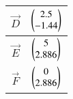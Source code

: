 
\begin{tabular}[]{|c|c|}
\hline
	$\vec{D}$	 & $\begin{pmatrix}2.5\\ -1.44\end{pmatrix}$ \\ \hline
	$\vec{E}$	 & $\begin{pmatrix}5\\ 2.886\end{pmatrix} $\\ \hline
	$\vec{F}$	& $\begin{pmatrix}0\\2.886\end{pmatrix}$\\ \hline
\end{tabular}
